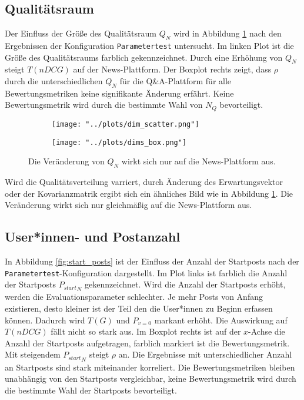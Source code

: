 \subsection{Qualitätsraum}

Der Einfluss der Größe des Qualitätsraum $Q_N$ wird in Abbildung \ref{fig:qual} nach den Ergebnissen der Konfiguration \texttt{Parametertest} untersucht. Im linken Plot ist die Größe des Qualitätsraums farblich gekennzeichnet. Durch eine Erhöhung von $Q_N$ steigt $T(nDCG)$ auf der News-Plattform. Der Boxplot rechts zeigt, dass $\rho$ durch die unterschiedlichen $Q_N$ für die Q\&A-Plattform für alle Bewertungsmetriken keine signifikante Änderung erfährt. Keine Bewertungsmetrik wird durch die bestimmte Wahl von $N_Q$ bevorteiligt.

\begin{figure}[!h]
	\begin{subfigure}{0.5\textwidth}
		\texttt{[image: "../plots/dim\_scatter.png"]}
	\end{subfigure}
	\begin{subfigure}{0.5\textwidth}
		\texttt{[image: "../plots/dims\_box.png"]}
	\end{subfigure}
	\caption{Die Veränderung von $Q_N$ wirkt sich nur auf die News-Plattform aus.}
	\label{fig:qual}	
\end{figure}

Wird die Qualitätsverteilung varriert, durch Änderung des Erwartungsvektor oder der Kovarianzmatrik ergibt sich ein ähnliches Bild wie in Abbildung \ref{fig:qual}. Die Veränderung wirkt sich nur gleichmäßig auf die News-Plattform aus. 


\subsection{User*innen- und Postanzahl}

In Abbildung \ref{fig:start_posts} ist der Einfluss der Anzahl der Startposts nach der \texttt{Parametertest}-Konfiguration dargestellt. Im Plot links ist farblich die Anzahl der Startposts ${P_{start}}_N$ gekennzeichnet. Wird die Anzahl der Startposts erhöht, werden die Evaluationsparameter schlechter. Je mehr Posts von Anfang existieren, desto kleiner ist der Teil den die User*innen zu Beginn erfassen können. Dadurch wird $T(G)$  und $P_{v=0}$ markant erhöht. Die Auswirkung auf $T(nDCG)$ fällt nicht so stark aus. Im Boxplot rechts ist auf der $x$-Achse die Anzahl der Startposts aufgetragen, farblich markiert ist die Bewertungsmetrik. Mit steigendem ${P_{start}}_N$ steigt $\rho$ an. Die Ergebnisse mit unterschiedlicher Anzahl an Startposts sind stark miteinander korreliert. Die Bewertungsmetriken bleiben unabhängig von den Startposts vergleichbar, keine Bewertungsmetrik wird durch die bestimmte Wahl der Startposts bevorteiligt.

